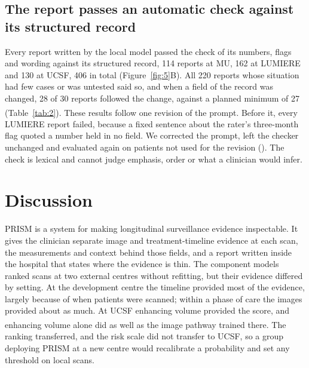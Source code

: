 \documentclass[largeformat]{interact} %
\newcommand{\expl}{\textsuperscript{\textdagger}}
\begin{document}
\subsection{The report passes an automatic check against its structured record}\label{sec:3.5}

Every report written by the local model passed the check of its numbers, flags and wording against its
structured record, 114 reports at MU, 162 at LUMIERE and 130 at UCSF, 406 in total (Figure~\ref{fig:5}B). All 220
reports whose situation had few cases or was untested said so, and when a field of the record was changed, 28 of 30
reports followed the change, against a planned minimum of 27 (Table~\ref{tab:2}). These results follow one revision of the prompt\expl. Before it, every LUMIERE report failed, because a fixed
sentence about the rater's three-month flag quoted a number held in no field. We corrected the prompt, left the
checker unchanged and evaluated again on patients not used for the revision ().
The check is lexical and cannot judge emphasis, order or what a clinician would infer.

\section{Discussion}\label{sec:4}

PRISM is a system for making longitudinal surveillance evidence inspectable. It gives the clinician separate image
and treatment-timeline evidence at each scan, the measurements and context behind those fields, and a report written
inside the hospital that states where the evidence is thin. The component models ranked scans at two external centres
without refitting, but their evidence differed by setting. At the development centre the timeline provided most of the
evidence, largely because of when patients were scanned; within a phase of care the images provided about as much. At
UCSF enhancing volume provided the score, and enhancing volume alone\expl{} did as well as the image pathway trained there.
The ranking transferred, and the risk scale did not transfer to UCSF, so a group deploying PRISM at a
new centre would recalibrate a probability and set any threshold on local scans.
\end{document}
